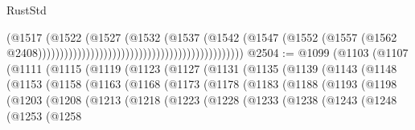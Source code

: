 \begin{lexlean}{RustStd}
\begin{coremodule}
                                                                              (@1517
                                                                                (@1522
                                                                                  (@1527
                                                                                    (@1532
                                                                                      (@1537
                                                                                        (@1542
                                                                                          (@1547
                                                                                            (@1552
                                                                                              (@1557
                                                                                                (@1562
                                                                                                  @2408)))))))))))))))))))))))))))))))))))))))))))))))
@2504 := @1099
    (@1103
      (@1107
        (@1111
          (@1115
            (@1119
              (@1123
                (@1127
                  (@1131
                    (@1135
                      (@1139
                        (@1143
                          (@1148
                            (@1153
                              (@1158
                                (@1163
                                  (@1168
                                    (@1173
                                      (@1178
                                        (@1183
                                          (@1188
                                            (@1193
                                              (@1198
                                                (@1203
                                                  (@1208
                                                    (@1213
                                                      (@1218
                                                        (@1223
                                                          (@1228
                                                            (@1233
                                                              (@1238
                                                                (@1243
                                                                  (@1248
                                                                    (@1253
                                                                      (@1258

\end{coremodule}
\end{lexlean}
